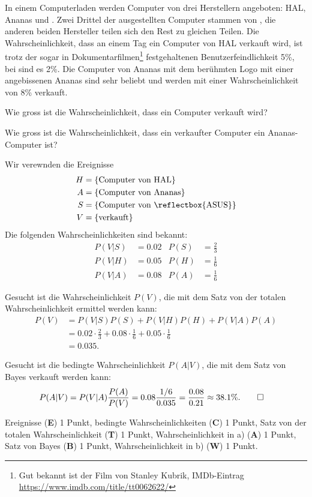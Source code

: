In einem Computerladen werden Computer von drei Herstellern angeboten:
HAL, Ananas und .
Zwei Drittel der ausgestellten Computer stammen von ,
die anderen beiden Hersteller teilen sich den Rest zu gleichen Teilen.
Die Wahrscheinlichkeit, dass an einem Tag ein Computer von HAL verkauft
wird, ist trotz der sogar in Dokumentarfilmen\footnote{Gut bekannt ist
der Film von Stanley Kubrik, IMDb-Eintrag
\url{https://www.imdb.com/title/tt0062622/}}
festgehaltenen
Benutzerfeindlichkeit 5\%, bei  sind es 2\%.
Die Computer von Ananas mit dem berühmten Logo mit einer angebissenen
Ananas sind sehr beliebt und werden mit einer Wahrscheinlichkeit von 8\%
verkauft.

\begin{teilaufgaben}
\item
Wie gross ist die Wahrscheinlichkeit, dass ein Computer verkauft wird?
\item
Wie gross ist die Wahrscheinlichkeit, dass ein verkaufter Computer ein
Ananas-Computer ist?
\end{teilaufgaben}

\begin{loesung}
Wir verewnden die Ereignisse
\begin{align*}
H&=\{\text{Computer von HAL}\}
\\
A&=\{\text{Computer von Ananas}\}
\\
S&=\{\text{Computer von \reflectbox{ASUS}}\}
\\
V&=\{\text{verkauft}\}
\end{align*}
Die folgenden Wahrscheinlichkeiten sind bekannt:
\begin{align*}
P(V|S)&= 0.02 & P(S) &= \frac23 \\
P(V|H)&= 0.05 & P(H) &= \frac16 \\
P(V|A)&= 0.08 & P(A) &= \frac16 
\end{align*}
\begin{teilaufgaben}
\item
Gesucht ist die Wahrscheinlichkeit $P(V)$, die mit dem Satz von
der totalen Wahrscheinlichkeit ermittel werden kann:
\begin{align*}
P(V)
&=
P(V|S)P(S)
+
P(V|H)P(H)
+
P(V|A)P(A)
\\
&=
0.02\cdot \frac23
+
0.08\cdot \frac16
+
0.05\cdot \frac16
\\
&=
0.035.
\end{align*}
\item
Gesucht ist die bedingte Wahrscheinlichkeit $P(A|V)$, die mit
dem Satz von Bayes verkauft werden kann:
\begin{align*}
P(A|V)
&=
P(V|A)\frac{P(A)}{P(V)}
=
0.08 \frac{1/6}{0.035}
=
\frac{0.08}{0.21}
\approx
38.1\%.
\qedhere
\end{align*}
\end{teilaufgaben}
\end{loesung}

\begin{bewertung}
Ereignisse ({\bf E}) 1 Punkt,
bedingte Wahrscheinlichkeiten ({\bf C}) 1 Punkt,
Satz von der totalen Wahrscheinlichkeit ({\bf T}) 1 Punkt,
Wahrscheinlichkeit in a) ({\bf A}) 1 Punkt,
Satz von Bayes ({\bf B}) 1 Punkt,
Wahrscheinlichkeit in b) ({\bf W}) 1 Punkt.
\end{bewertung}
